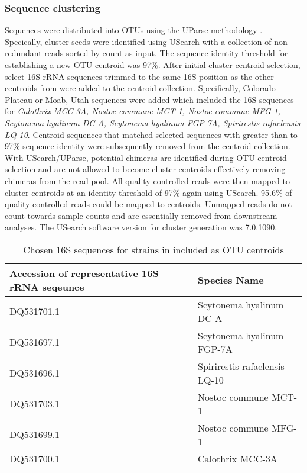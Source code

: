 \subsubsection{Sequence clustering}
Sequences were distributed into OTUs using the UParse methodology \citep{23955772}. Specically, cluster seeds were identified using USearch with a collection of non-redundant reads sorted by count as input. The sequence identity threshold for establishing a new OTU centroid was 97\%. After initial cluster centroid selection, select 16S rRNA sequences trimmed to the same 16S position as the other centroids from \citet{Yeager} were added to the centroid collection. Specifically, \citet{Yeager} Colorado Plateau or Moab, Utah sequences were added which included the 16S sequences for \textit{Calothrix MCC-3A, Nostoc commune MCT-1, Nostoc commune MFG-1, Scytonema hyalinum DC-A, Scytonema hyalinum FGP-7A, Spirirestis rafaelensis LQ-10}. Centroid sequences that matched selected \citet{Yeager} sequences with greater than to 97\% sequence identity were subsequently removed from the centroid collection. With USearch/UParse, potential chimeras are identified during OTU centroid selection and are not allowed to become cluster centroids effectively removing chimeras from the read pool. All quality controlled reads were then mapped to cluster centroids at an identity threshold of 97\% again using USearch. 95.6\% of quality controlled reads could be mapped to centroids. Unmapped reads do not count towards sample counts and are essentially removed from downstream analyses. The USearch software version for cluster generation was 7.0.1090.

\begin{table}
\begin{center}
\begin{tabular}{ l l }
\textbf{Accession of representative 16S rRNA seqeunce} &
\textbf{Species Name} \\ 
\hline
DQ531701.1 & Scytonema hyalinum DC-A \\
DQ531697.1 & Scytonema hyalinum FGP-7A \\
DQ531696.1 & Spirirestis rafaelensis LQ-10 \\
DQ531703.1 & Nostoc commune MCT-1 \\
DQ531699.1 & Nostoc commune MFG-1 \\
DQ531700.1 & Calothrix MCC-3A  \\
\hline
\end{tabular}
\end{center}
\caption{Chosen 16S sequences for strains in \citet{Yeager} included as OTU centroids}
\label{table:yeager_2006}
\end{table}

